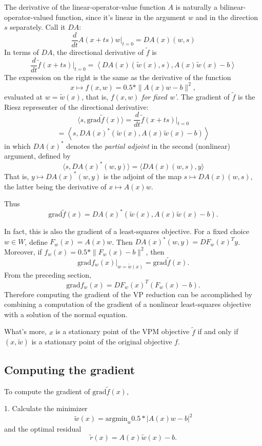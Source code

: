 The derivative of the linear-operator-value function $A$ is naturally a bilinear-operator-valued function, since it's linear in the argument $w$ and in the direction $s$ separately. Call it $DA$:
$$
\frac{d}{dt}A(x+ts)w|_{t=0} = DA(x)(w,s)
$$ 
In terms of $DA$, the directional derivative of $\tilde{f}$ is
$$
\frac{d}{dt}\tilde{f}(x+ts)|_{t=0} = \left\langle DA(x)(\tilde{w}(x),s), A(x)\tilde{w}(x)-b\right\rangle 
$$
The expression on the right is the same as the derivative of the function
$$
x \mapsto f(x,w) = 0.5*\|A(x)w-b\|^2,
$$ 
evaluated at $w=\tilde{w}(x)$, that is, $f(x,w)$ {\em for fixed w'}. 
The gradient of $\tilde{f}$ is the Riesz representer of the directional derivative:
$$
\langle s, \mbox{grad} \tilde{f}(x)\rangle = \frac{d}{dt}\tilde{f}(x+ts)|_{t=0}
$$
$$
= \left\langle s, DA(x)^*(\tilde{w}(x),A(x)\tilde{w}(x)-b)\right\rangle 
$$
in which $DA(x)^*$ denotes the {\em partial adjoint} in the second (nonlinear) argument, defined by
$$
\langle s, DA(x)^*(w,y) \rangle = \langle DA(x)(w,s),y\rangle
$$
That is, $y \mapsto DA(x)^*(w,y)$ is the adjoint of the map $s \mapsto DA(x)(w,s)$, the latter being the derivative of $x \mapsto A(x)w$. 

Thus
$$
\mbox{grad} \tilde{f}(x) = DA(x)^*(\tilde{w}(x),A(x)\tilde{w}(x)-b).
$$

In fact, this is also the gradient of a least-squares objective.
For a fixed choice $w \in W$, define $F_w(x) = A(x)w$. Then $DA(x)^*(w,y) = DF_w(x)^Ty$. Moreover, if $f_w(x) = 0.5*\|F_w(x)-b\|^2$, then 
$$
\mbox{grad} f_w(x)|_{w=\tilde{w}(x)} =  \mbox{grad}\tilde{f}(x).
$$
From the preceding section,
$$
\mbox{grad} f_w(x) = DF_w(x)^T(F_w(x)-b).
$$ 
Therefore computing the gradient of the VP reduction can be accomplished by combining a computation of the gradient of a nonlinear least-squares objective with a solution of the normal equation.

What's more, $x$ is a stationary point of the VPM objective $\tilde{f}$ if and only if $(x,\tilde{w})$ is a stationary point of the original objective $f$.

\subsection{Computing the gradient}
To compute the gradient of $\mbox{grad} \tilde{f}(x)$,

1. Calculate the minimizer 
\begin{equation}
  \label{eqn:g1}
\tilde{w}(x) = \mbox{argmin}_w 0.5*|A(x)w-b|^2
\end{equation}
and the optimal residual
\begin{equation}
  \label{eqn:g2}
  \tilde{r}(x) = A(x)\tilde{w}(x) - b.
\end{equation}

